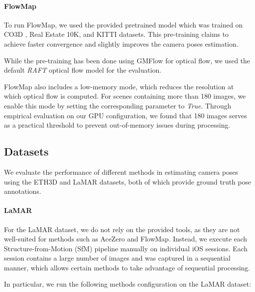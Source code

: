 \paragraph{FlowMap}
To run FlowMap, we used the provided pretrained model which was trained on CO3D \cite{reizenstein21co3d}, Real Estate 10K, and KITTI \cite{geiger2012kitti} datasets.
This pre-training claims to achieve faster convergence and slightly improves the camera poses estimation.

While the pre-training has been done using GMFlow \cite{xu2022gmflow} for optical flow, we used the default \textit{RAFT} \cite{teed2020raft} optical flow model for the evaluation.

FlowMap also includes a low-memory mode, which reduces the resolution at which optical flow is computed. 
For scenes containing more than 180 images, we enable this mode by setting the corresponding parameter to \textit{True}. 
Through empirical evaluation on our GPU configuration, we found that 180 images serves as a practical threshold to prevent out-of-memory issues during processing.

\subsection{Datasets}
We evaluate the performance of different methods in estimating camera poses using the ETH3D and LaMAR datasets, both of which provide ground truth pose annotations.

\paragraph{LaMAR}
For the LaMAR dataset, we do not rely on the provided tools, as they are not well-suited for methods such as AceZero and FlowMap. Instead, we execute each Structure-from-Motion (SfM) pipeline manually on individual iOS sessions. 
Each session contains a large number of images and was captured in a sequential manner, which allows certain methods to take advantage of sequential processing.

In particular, we run the following methods configuration on the LaMAR dataset:

